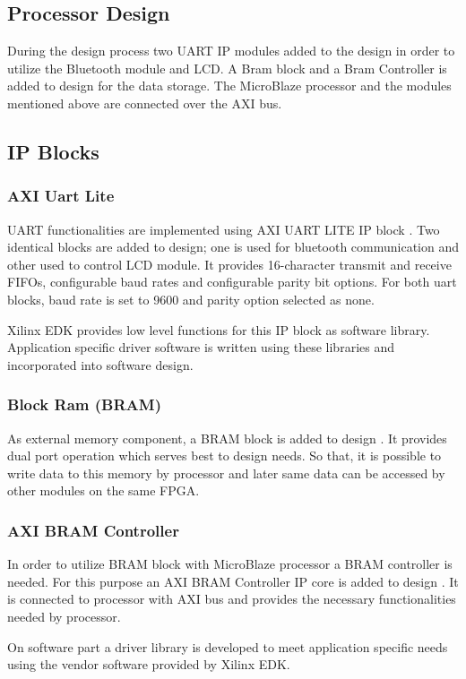 \subsection{Processor Design}
During the design process two UART IP modules added to the design in order to utilize the Bluetooth module and LCD. A Bram block and a Bram Controller is added to design for the data storage. The MicroBlaze processor and the modules mentioned above are connected over the AXI bus.
\subsection{IP Blocks}

\subsubsection{AXI Uart Lite}
UART functionalities are implemented using AXI UART LITE IP block \cite{axi-uart}. Two identical blocks are added to design; one is used for bluetooth communication and other used to control LCD module. It provides 16-character transmit and receive FIFOs, configurable baud rates and configurable parity bit options. For both uart blocks, baud rate is set to 9600 and parity option selected as none.

Xilinx EDK provides low level functions for this IP block as software library. Application specific driver software is written using these libraries and incorporated into software design.   
\subsubsection{Block Ram (BRAM)}
As external memory component, a BRAM block is added to design \cite{bram-block}. It provides dual port operation which serves best to design needs. So that, it is possible to write data to this memory by processor and later same data can be accessed by other modules on the same FPGA.
   
\subsubsection{AXI BRAM Controller}
In order to utilize BRAM block with MicroBlaze processor a BRAM controller is needed. For this purpose an AXI BRAM Controller IP core is added to design \cite{bram-ctr}. It is connected to processor with AXI bus and provides the necessary functionalities needed by processor.

On software part a driver library is developed to meet application specific needs using the vendor software provided by Xilinx EDK.

